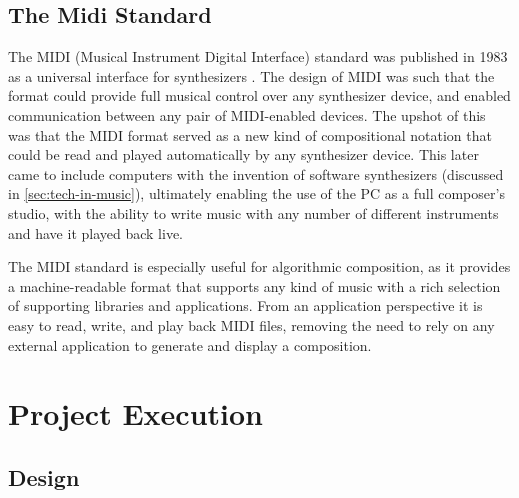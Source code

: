 \documentclass[ author={Stephen Livermore-Tozer},
				supervisor={Dr. Peter Flach},
				degree={MEng},
				title={Performing Algorithmic Co-composition Using Machine Learning},
				subtitle={},
				type={research},
				year={2016} ]{dissertation}
\begin{document}
	
	\section{The Midi Standard}
	\label{sec:midi}
	
	The MIDI (Musical Instrument Digital Interface) standard was published in 1983 as a universal interface for synthesizers  \cite{swift1997brief}. The design of MIDI was such that the format could provide full musical control over any synthesizer device, and enabled communication between any pair of MIDI-enabled devices. The upshot of this was that the MIDI format served as a new kind of compositional notation that could be read and played automatically by any synthesizer device. This later came to include computers with the invention of software synthesizers (discussed in \ref{sec:tech-in-music}), ultimately enabling the use of the PC as a full composer's studio, with the ability to write music with any number of different instruments and have it played back live. 
	
	The MIDI standard is especially useful for algorithmic composition, as it provides a machine-readable format that supports any kind of music with a rich selection of supporting libraries and applications. From an application perspective it is easy to read, write, and play back MIDI files, removing the need to rely on any external application to generate and display a composition. 
	
	\chapter{Project Execution}
	\label{chap:execution}
	
%	
	
	\section{Design}
	
\end{document}
